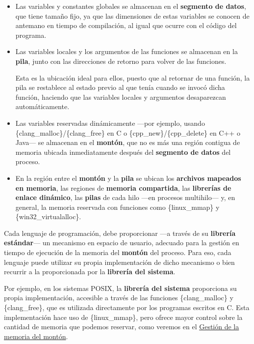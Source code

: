 \begin{itemize}
\item
  Las variables y constantes globales se almacenan en el
  \textbf{segmento de datos}{}, que tiene tamaño fijo, ya que las
  dimensiones de estas variables se conocen de antemano en tiempo de
  compilación, al igual que ocurre con el código del programa.
\item
  Las variables locales y los argumentos de las funciones se almacenan
  en la \textbf{{}pila}, junto con las direcciones de retorno para
  volver de las funciones.

  Esta es la ubicación ideal para ellos, puesto que al retornar de una
  función, la pila se restablece al estado previo al que tenía cuando se
  invocó dicha función, haciendo que las variables locales y argumentos
  desaparezcan automáticamente.
\item
  Las variables reservadas dinámicamente ---por ejemplo, usando
  \{clang\_malloc\}/\{clang\_free\} en C o \{cpp\_new\}/\{cpp\_delete\}
  en C++ o Java--- se almacenan en el \textbf{{}montón}, que no es más
  una región contigua de memoria ubicada inmediatamente después del
  \textbf{segmento de datos} del proceso.
\item
  En la región entre el \textbf{montón} y la \textbf{pila} se ubican los
  \textbf{archivos mapeados en memoria}, las regiones de \textbf{memoria
  compartida}, las \textbf{librerías de enlace dinámico}, las
  \textbf{pilas} de cada hilo ---en procesos multihilo--- y, en general,
  la memoria reservada con funciones como \{linux\_mmap\} y
  \{win32\_virtualalloc\}.
\end{itemize}

Cada lenguaje de programación, debe proporcionar ---a través de su
\textbf{librería estándar}--- un mecanismo en espacio de usuario,
adecuado para la gestión en tiempo de ejecución de la memoria del
\textbf{montón} del proceso. Para eso, cada lenguaje puede utilizar su
propia implementación de dicho mecanismo o bien recurrir a la
proporcionada por la \textbf{librería del sistema}.

Por ejemplo, en los sistemas POSIX, la \textbf{librería del sistema}
proporciona su propia implementación, accesible a través de las
funciones \{clang\_malloc\} y \{clang\_free\}, que es utilizada
directamente por los programas escritos en C. Esta implementación hace
uso de \{linux\_mmap\}, pero ofrece mayor control sobre la cantidad de
memoria que podemos reservar, como veremos en el
\hyperref[_gestiuxf3n_de_la_memoria_del_montuxf3n]{Gestión de la memoria
del montón}.

